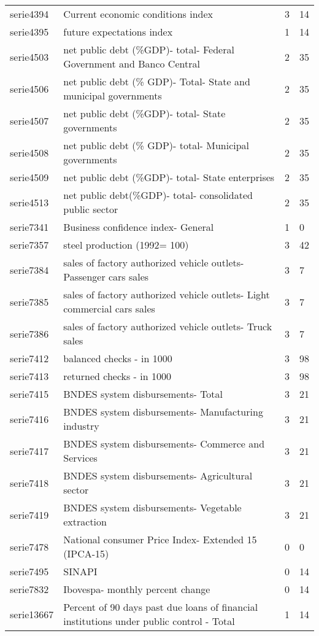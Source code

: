\documentclass{article}
\begin{document}
\begin{landscape}
\begin{center}
\begin{longtable}{|l|l|l|l|}
serie4394 & Current economic conditions index & 3 & 14 \\
serie4395 & future expectations index & 1 & 14 \\
serie4503 & net public debt (\%GDP)- total- Federal Government and Banco Central & 2 & 35 \\
serie4506 & net public debt (\% GDP)- Total- State and municipal governments & 2 & 35 \\
serie4507 & net public debt (\%GDP)- total- State governments & 2 & 35 \\
serie4508 & net public debt (\% GDP)- total- Municipal governments & 2 & 35 \\
serie4509 & net public debt (\%GDP)- total- State enterprises & 2 & 35 \\
serie4513 & net public debt(\%GDP)- total- consolidated public sector & 2 & 35 \\
serie7341 & Business confidence index- General & 1 & 0 \\
serie7357 & steel production (1992= 100) & 3 & 42 \\
serie7384 & sales of factory authorized vehicle outlets- Passenger cars sales & 3 & 7 \\
serie7385 & sales of factory authorized vehicle outlets- Light commercial cars sales & 3 & 7 \\
serie7386 & sales of factory authorized vehicle outlets- Truck sales & 3 & 7 \\
serie7412 & balanced checks - in 1000 & 3 & 98 \\
serie7413 & returned checks - in 1000 & 3 & 98 \\
serie7415 & BNDES system disbursements- Total & 3 & 21 \\
serie7416 & BNDES system disbursements- Manufacturing industry & 3 & 21 \\
serie7417 & BNDES system disbursements- Commerce and Services & 3 & 21 \\
serie7418 & BNDES system disbursements- Agricultural sector & 3 & 21 \\
serie7419 & BNDES system disbursements- Vegetable extraction & 3 & 21 \\
serie7478 & National consumer Price Index- Extended 15 (IPCA-15) & 0 & 0 \\
serie7495 & SINAPI & 0 & 14 \\
serie7832 & Ibovespa- monthly percent change & 0 & 14 \\
serie13667 & Percent of 90 days past due loans of financial institutions under public control - Total & 1 & 14 \\

\end{longtable}
\end{center}
\end{landscape}
\end{document}
